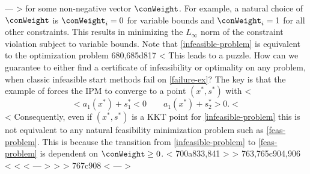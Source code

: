 ---
> for some non-negative vector $\conWeight$. For example, a natural choice of $\conWeight$ is $\conWeight_i = 0$ for variable bounds and $\conWeight_i = 1$ for all other constraints. This results in minimizing the $L_{\infty}$ norm of the constraint violation subject to variable bounds. Note that \eqref{infeasible-problem} is equivalent to the optimization problem
680,685d817
< This leads to a puzzle. How can we guarantee to either find a certificate of infeasibility or optimality on any problem, when classic infeasible start methods fail on \eqref{failure-ex}? The key is that the example of \citet*{wachter2000failure} forces the IPM to converge to a point $(x^{*}, s^{*})$ with
< $$
< a_1(x^{*}) + s^{*}_1 < 0 \quad \quad a_1(x^{*}) + s^{*}_2 > 0.
< $$
< Consequently, even if $(x^{*}, s^{*})$ is a KKT point for \eqref{infeasible-problem} this is not equivalent to any natural feasibility minimization problem such as \eqref{feas-problem}. This is because the transition from \eqref{infeasible-problem} to \eqref{feas-problem} is dependent on $\conWeight \ge 0$.
< 
700a833,841
> 
> 
763,765c904,906
< %
< %
< %
---
> %
> %
> %
767c908
< %
---
> %
